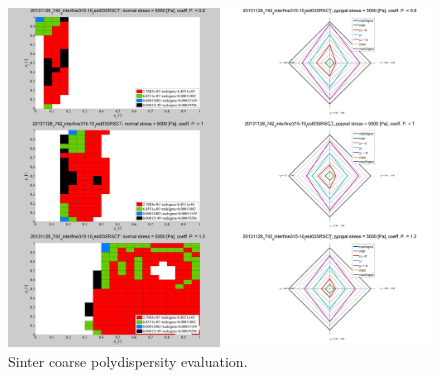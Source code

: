 \begin{figure}[!htb]
\centering
\includegraphics[width=.96\columnwidth]{images/087sinter31510}
\caption[Sinter coarse polydispersity evaluation]{Sinter coarse polydispersity
evaluation.}
\label{fig:087sinter31510}
\end{figure}